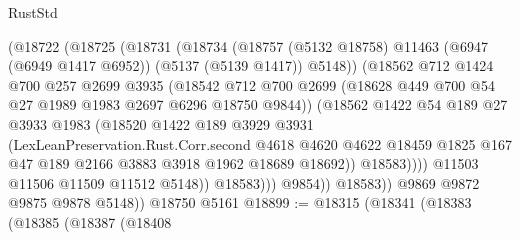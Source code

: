 \begin{lexlean}{RustStd}
\begin{coremodule}
                        (@18722
                          (@18725
                            (@18731
                              (@18734
                                (@18757
                                  (@5132 @18758)
                                  @11463
                                  (@6947 (@6949 @1417 @6952))
                                  (@5137 (@5139 @1417))
                                  @5148))
                              (@18562
                                @712
                                @1424
                                @700
                                @257
                                @2699
                                @3935
                                (@18542
                                  @712
                                  @700
                                  @2699
                                  (@18628 @449 @700 @54 @27 @1989 @1983 @2697 @6296 @18750 @9844))
                                (@18562
                                  @1422
                                  @54
                                  @189
                                  @27
                                  @3933
                                  @1983
                                  (@18520
                                    @1422
                                    @189
                                    @3929
                                    @3931
                                    (LexLeanPreservation.Rust.Corr.second
                                      @4618
                                      @4620
                                      @4622
                                      @18459
                                      @1825
                                      @167
                                      @47
                                      @189
                                      @2166
                                      @3883
                                      @3918
                                      @1962
                                      @18689
                                      @18692))
                                  @18583))))
                          @11503
                          @11506
                          @11509
                          @11512
                          @5148))
                      @18583)))
                @9854))
            @18583))
        @9869
        @9872
        @9875
        @9878
        @5148))
    @18750
    @5161
@18899 := @18315
    (@18341
      (@18383
        (@18385
          (@18387
            (@18408

\end{coremodule}
\end{lexlean}
